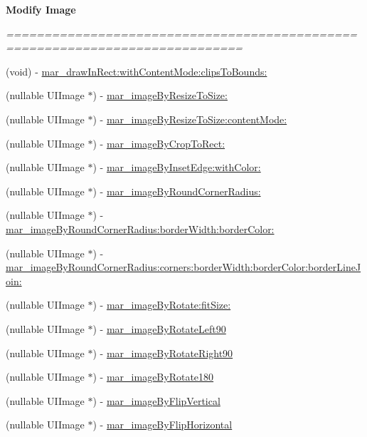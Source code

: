 \begin{Indent}\textbf{ Modify Image}\par
{\em ============================================================================= 

 }\begin{DoxyCompactItemize}
\item 
(void) -\/ \hyperlink{category_u_i_image_07_m_a_r_e_x_08_a3b3c0678b4f8d0fbfe0462b1457589c2}{mar\+\_\+draw\+In\+Rect\+:with\+Content\+Mode\+:clips\+To\+Bounds\+:}
\item 
(nullable U\+I\+Image $\ast$) -\/ \hyperlink{category_u_i_image_07_m_a_r_e_x_08_af12a9f699153eb6a42a876a72967db3b}{mar\+\_\+image\+By\+Resize\+To\+Size\+:}
\item 
(nullable U\+I\+Image $\ast$) -\/ \hyperlink{category_u_i_image_07_m_a_r_e_x_08_a396de936fdc530ff44abf786ab45c60c}{mar\+\_\+image\+By\+Resize\+To\+Size\+:content\+Mode\+:}
\item 
(nullable U\+I\+Image $\ast$) -\/ \hyperlink{category_u_i_image_07_m_a_r_e_x_08_a199c6d0e4ae79a0deee0fd09ef495c90}{mar\+\_\+image\+By\+Crop\+To\+Rect\+:}
\item 
(nullable U\+I\+Image $\ast$) -\/ \hyperlink{category_u_i_image_07_m_a_r_e_x_08_ae6cd33f2aae5e492cf8ff18ceea8b4bd}{mar\+\_\+image\+By\+Inset\+Edge\+:with\+Color\+:}
\item 
(nullable U\+I\+Image $\ast$) -\/ \hyperlink{category_u_i_image_07_m_a_r_e_x_08_a3928ead790b37d111c1e1c059c302211}{mar\+\_\+image\+By\+Round\+Corner\+Radius\+:}
\item 
(nullable U\+I\+Image $\ast$) -\/ \hyperlink{category_u_i_image_07_m_a_r_e_x_08_a831e6e539d393346991439aeb4e0f8d2}{mar\+\_\+image\+By\+Round\+Corner\+Radius\+:border\+Width\+:border\+Color\+:}
\item 
(nullable U\+I\+Image $\ast$) -\/ \hyperlink{category_u_i_image_07_m_a_r_e_x_08_a847a973c83e4efef140840e811993eff}{mar\+\_\+image\+By\+Round\+Corner\+Radius\+:corners\+:border\+Width\+:border\+Color\+:border\+Line\+Join\+:}
\item 
(nullable U\+I\+Image $\ast$) -\/ \hyperlink{category_u_i_image_07_m_a_r_e_x_08_a26ce4b42045cf225dceed3520912061c}{mar\+\_\+image\+By\+Rotate\+:fit\+Size\+:}
\item 
(nullable U\+I\+Image $\ast$) -\/ \hyperlink{category_u_i_image_07_m_a_r_e_x_08_ae0b14ff942eb84cd3b6de64367580f2f}{mar\+\_\+image\+By\+Rotate\+Left90}
\item 
(nullable U\+I\+Image $\ast$) -\/ \hyperlink{category_u_i_image_07_m_a_r_e_x_08_a01724eeadd53e5d8530d90dcfa93a82e}{mar\+\_\+image\+By\+Rotate\+Right90}
\item 
(nullable U\+I\+Image $\ast$) -\/ \hyperlink{category_u_i_image_07_m_a_r_e_x_08_af209792ff45da2713eee418e370f3df9}{mar\+\_\+image\+By\+Rotate180}
\item 
(nullable U\+I\+Image $\ast$) -\/ \hyperlink{category_u_i_image_07_m_a_r_e_x_08_a19e50375deaeddaccf9e4e2ba1dae3f8}{mar\+\_\+image\+By\+Flip\+Vertical}
\item 
(nullable U\+I\+Image $\ast$) -\/ \hyperlink{category_u_i_image_07_m_a_r_e_x_08_a7e129904266795de6d7631b4ddc3449f}{mar\+\_\+image\+By\+Flip\+Horizontal}
\end{DoxyCompactItemize}
\end{Indent}
